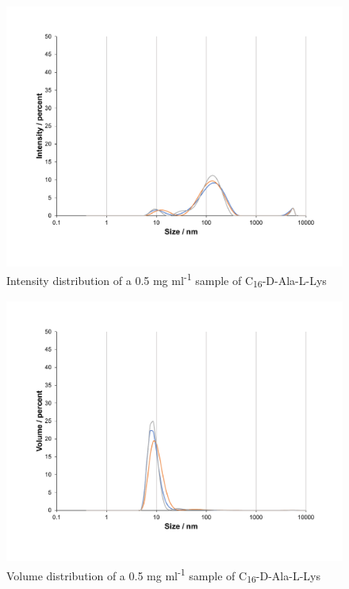 
\begin{figure} [ht!]
\centering
 \includegraphics[scale=0.47]{DLS/KAT1_22_0_5mg_ml-1_size.pdf}
\caption{Intensity distribution of a 0.5 mg ml\textsuperscript{-1} sample of C\textsubscript{16}-D-Ala-L-Lys}
\label{intensity_distribution_KAT1.22_0.5}
\end{figure}
\begin{figure} [ht!]
\centering
\includegraphics[scale=0.47]{DLS/KAT1_22_0_5mg_ml-1_volume.pdf}
\caption{Volume distribution of a 0.5 mg ml\textsuperscript{-1} sample of C\textsubscript{16}-D-Ala-L-Lys}
\label{volume_distribution_KAT1.22_0.5}
\end{figure}

